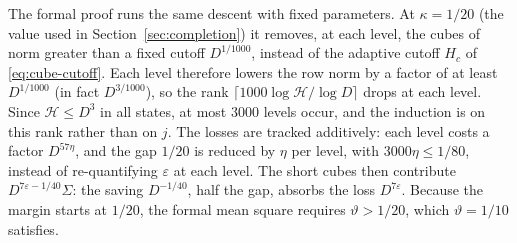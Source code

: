 \begin{remark}\label{rem:formal-descent}
The formal proof runs the same descent with fixed parameters. At $\kappa=1/20$ (the value used in
Section~\ref{sec:completion}) it removes, at each level, the cubes of norm greater than a fixed
cutoff $D^{1/1000}$, instead of the adaptive cutoff $H_c$ of \eqref{eq:cube-cutoff}. Each level
therefore lowers the row norm by a factor of at least $D^{1/1000}$ (in fact $D^{3/1000}$), so the
rank $\lceil1000\log\mathcal H/\log D\rceil$ drops at each level. Since $\mathcal H\le D^3$ in all
states, at most $3000$ levels occur, and the induction is on this rank rather than on $j$. The losses
are tracked additively: each level costs a factor $D^{57\eta}$, and the gap $1/20$ is reduced
by $\eta$ per level, with $3000\eta\le1/80$, instead of re-quantifying $\varepsilon$ at each
level. The short cubes then contribute $D^{7\varepsilon-1/40}\Sigma$: the saving $D^{-1/40}$,
half the gap, absorbs the loss $D^{7\varepsilon}$. Because the margin starts at $1/20$, the
formal mean square requires $\vartheta>1/20$, which $\vartheta=1/10$ satisfies.
\end{remark}
